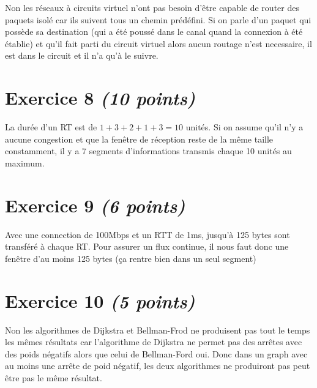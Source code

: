 \documentclass{article}
\begin{document}
Non les réseaux à circuits virtuel n'ont pas besoin d'être capable de router des paquets isolé car ils suivent tous un chemin prédéfini. Si on parle d'un paquet qui possède sa destination (qui a été poussé dans le canal quand la connexion à été établie) et qu'il fait parti du circuit virtuel alors aucun routage n'est necessaire, il est dans le circuit et il n'a qu'à le suivre.


\section{Exercice 8 \emph{(10 points)}}
La durée d'un RT est de $1 + 3 + 2 + 1 + 3 = 10$ unités. Si on assume qu'il n'y a aucune congestion et que la fenêtre de réception reste de la même taille constamment, il y a $7$ segments d'informations transmis chaque 10 unités au maximum.


\section{Exercice 9 \emph{(6 points)}}
Avec  une connection de 100Mbps et un RTT de 1ms, jusqu'à 125 bytes sont transféré à chaque RT.
Pour assurer un flux continue, il nous faut donc une fenêtre d'au moins 125 bytes (ça rentre bien dans un seul segment)


\section{Exercice 10 \emph{(5 points)}}

Non les algorithmes de Dijkstra et Bellman-Frod ne produisent pas tout le temps les mêmes résultats car l'algorithme de Dijkstra ne permet pas des arrêtes avec des poids négatifs alors que celui de Bellman-Ford oui. Donc dans un graph avec au moins une arrête de poid négatif, les deux algorithmes ne produiront pas peut être pas le même résultat.
\end{document}
